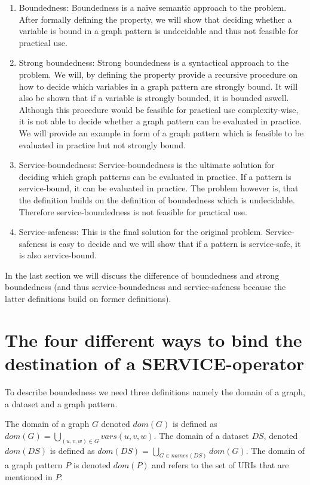 \begin{enumerate}
	\item Boundedness: Boundedness is a na{\"i}ve semantic approach to the
		problem. After formally defining the property, we will show that
		deciding whether a variable is bound in a graph pattern
		is undecidable and thus not feasible for practical use.

	\item Strong boundedness: Strong boundedness is a syntactical approach to
		the problem. We will, by defining the property provide a recursive
		procedure on how to decide which variables in a graph pattern are
		strongly bound. It will also be shown that if a variable is strongly
		bounded, it is bounded aswell. 
		Although this procedure would be feasible for practical
		use complexity-wise, it is not able to decide whether a graph pattern
		can be evaluated in practice. We will provide an example in form of a
		graph pattern which is feasible to be evaluated in practice but not
		strongly bound.

	\item Service-boundedness: Service-boundedness is the ultimate solution for
		deciding which graph patterns can be evaluated in practice. If a pattern
		is service-bound, it can be evaluated in practice. The problem however
		is, that the definition builds on the definition of boundedness which is
		undecidable. Therefore service-boundedness is not feasible for practical
		use.
	\item Service-safeness: This is the final solution for the original problem.
		Service-safeness is easy to decide and we will show that if a pattern is
		service-safe, it is also service-bound.
\end{enumerate}

In the last section we will discuss the difference of boundedness and strong
boundedness (and thus service-boundedness and service-safeness because the
latter definitions build on former definitions).

\section{The four different ways to bind the destination of a SERVICE-operator}

To describe boundedness we need three definitions namely the domain of a graph,
a dataset and a graph pattern.

\begin{definition}
    The domain of a graph $G$ denoted $dom(G)$ is defined as $dom(G) = \bigcup\limits_{(u,v,w) \in G}
    vars(u,v,w)$. The domain of a dataset $DS$, denoted $dom(DS)$ is defined as
    $dom(DS) = \bigcup\limits_{G \in names(DS)} dom(G)$.
    The domain of a graph pattern $P$ is denoted $dom(P)$ and refers to the set of URIs that are
mentioned in $P$.
\end{definition}

